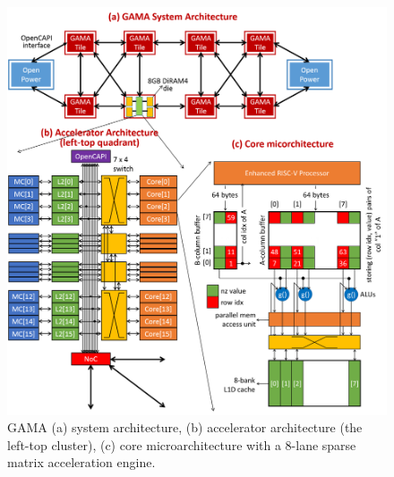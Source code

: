 \begin{figure}
\center
\includegraphics[width=1.0\linewidth]{fig/arch.png}
\caption{GAMA (a) system architecture, (b) accelerator architecture (the left-top cluster), (c) core microarchitecture with a 8-lane sparse matrix acceleration engine.}
\label{fig:arch}
\end{figure}


